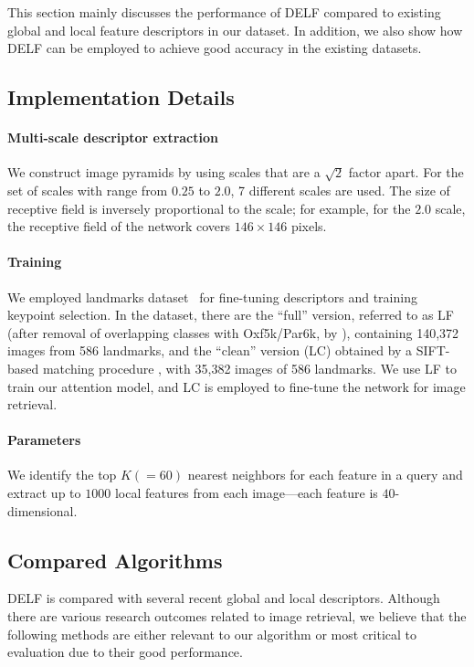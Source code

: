 \documentclass[10pt,twocolumn,letterpaper]{article}
\begin{document}
This section mainly discusses the performance of DELF compared to existing global and local feature descriptors in our dataset.
In addition, we also show how DELF can be employed to achieve good accuracy in the existing datasets.



\subsection{Implementation Details}

\paragraph{Multi-scale descriptor extraction}
We construct image pyramids by using scales that are a $\sqrt{2}$ factor apart.
For the set of scales with range from $0.25$ to $2.0$, 7 different scales are used.
The size of receptive field is inversely proportional to the scale; for example, for the $2.0$ scale, the receptive field of the network covers $146 \times 146$ pixels.



\vspace{-10pt}
\paragraph{Training}
We employed landmarks dataset~\cite{babenko2014neural} for fine-tuning descriptors and training keypoint selection.
In the dataset, there are the ``full'' version, referred to as LF (after removal of overlapping classes with Oxf5k/Par6k, by \cite{gordo2016deep}), containing 140,372 images from 586 landmarks, and the ``clean'' version (LC) obtained by a SIFT-based matching procedure \cite{gordo2016deep}, with 35,382 images of 586 landmarks.
We use LF to train our attention model, and LC is employed to fine-tune the network for image retrieval.


\vspace{-10pt}
\paragraph{Parameters} 
We identify the top $K (= 60)$ nearest neighbors for each feature in a query and extract up to $1000$ local features from each image---each feature is $40$-dimensional.


\subsection{Compared Algorithms}
DELF is compared with several recent global and local descriptors.
Although there are various research outcomes related to image retrieval, we believe that the following methods are either relevant to our algorithm or most critical to evaluation due to their good performance.
\end{document}
